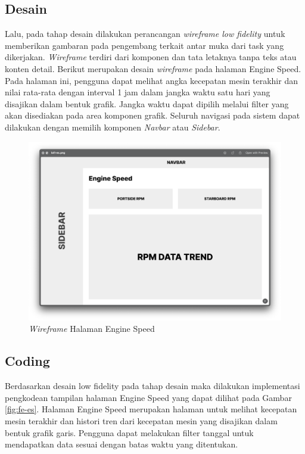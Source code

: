 \subsection{Desain}

Lalu, pada tahap desain dilakukan perancangan \textit{wireframe low fidelity} untuk memberikan gambaran pada pengembang terkait antar muka dari task yang dikerjakan. \textit{Wireframe} terdiri dari komponen dan tata letaknya tanpa teks atau konten detail.
Berikut merupakan desain \textit{wireframe} pada halaman Engine Speed. Pada halaman ini, pengguna dapat melihat angka kecepatan mesin terakhir dan nilai rata-rata dengan interval 1 jam dalam jangka waktu satu hari yang disajikan dalam bentuk grafik. Jangka waktu dapat dipilih melalui filter yang akan disediakan pada area komponen grafik. Seluruh navigasi pada sistem dapat dilakukan dengan memilih komponen \textit{Navbar} atau \textit{Sidebar}.

\begin{figure}[!h]
    \includegraphics[width=1.05\linewidth, center]{images/hasil/iterations/1/lofi-es.png}
    \caption{\textit{Wireframe} Halaman Engine Speed}
    \label{fig:lofi-es}
\end{figure}

\subsection{Coding}

Berdasarkan desain low fidelity pada tahap desain maka dilakukan implementasi pengkodean tampilan halaman Engine Speed yang dapat dilihat pada Gambar \ref{fig:fe-es}. Halaman Engine Speed merupakan halaman untuk melihat kecepatan mesin terakhir dan histori tren dari kecepatan mesin yang disajikan dalam bentuk grafik garis. Pengguna dapat melakukan filter tanggal untuk mendapatkan data sesuai dengan batas waktu yang ditentukan.


